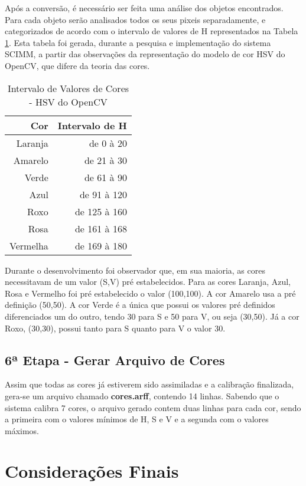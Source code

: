 Após a conversão, é necessário ser feita uma análise dos objetos encontrados. Para cada objeto serão analisados todos os seus pixeis separadamente, e categorizados de acordo com o intervalo de valores de H representados na Tabela \ref{tab:categorias}. Esta tabela foi gerada, durante a pesquisa e implementação do sistema SCIMM, a partir das observações da representação do modelo de cor HSV do OpenCV, que difere da teoria das cores.

\begin{table}[H]
\centering
\begin{tabular}{r|r}
Cor & Intervalo de H \\ %
\hline                               %
Laranja & de 0 à 20 \\
\hline 
Amarelo & de 21 à 30\\
\hline 
Verde & de 61 à 90 \\
\hline 
Azul& de 91 à 120 \\
\hline 
Roxo & de 125 à 160 \\
\hline 
Rosa & de 161 à 168 \\
\hline 
Vermelha & de 169 à 180 \\
\hline 
\end{tabular}
\caption{Intervalo de Valores de Cores - HSV do OpenCV}
\label{tab:categorias}
\end{table}

Durante o desenvolvimento foi observador que, em sua maioria, as cores necessitavam de um valor (S,V) pré estabelecidos. Para as cores Laranja, Azul, Rosa e Vermelho foi pré estabelecido o valor (100,100). A cor Amarelo usa a pré definição (50,50). A cor Verde é a única que possui os valores pré definidos diferenciados um do outro, tendo 30 para S e 50 para V, ou seja (30,50). Já a cor Roxo, (30,30), possui tanto para S quanto para V o valor 30.

  \subsection{6ª Etapa - Gerar Arquivo de Cores}
  Assim que todas as cores já estiverem sido assimiladas e a calibração finalizada, gera-se um arquivo chamado \textbf{cores.arff}, contendo 14 linhas. Sabendo que o sistema calibra 7 cores, o arquivo gerado contem duas linhas para cada cor, sendo a primeira com o valores mínimos de H, S e V e a segunda com o valores máximos.

\section{Considerações Finais}


